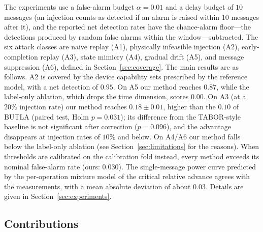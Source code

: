 \documentclass[manuscript,screen,review]{acmart}
\begin{document}
The experiments use a false-alarm budget $\alpha=0.01$ and a delay budget of $10$ messages (an injection counts as detected if an alarm is raised within $10$ messages after it), and the reported net detection rates have the chance-alarm floor---the detections produced by random false alarms within the window---subtracted. The six attack classes are naive replay ({A1}), physically infeasible injection ({A2}), early-completion replay ({A3}), state mimicry ({A4}), gradual drift ({A5}), and message suppression ({A6}), defined in Section~\ref{sec:coverage}. The main results are as follows. {A2} is covered by the device capability sets prescribed by the reference model, with a net detection of $0.95$. On {A5} our method reaches $0.87$, while the label-only ablation, which drops the time dimension, scores $0.00$. On {A3} (at a $20\%$ injection rate) our method reaches $0.18{\pm}0.01$, higher than the $0.10$ of {BUTLA} (paired test, {Holm} $p=0.031$); its difference from the {TABOR}-style baseline is not significant after correction ($p=0.096$), and the advantage disappears at injection rates of $10\%$ and below. On {A4}/{A6} our method falls below the label-only ablation (see Section~\ref{sec:limitations} for the reasons). When thresholds are calibrated on the calibration fold instead, every method exceeds its nominal false-alarm rate (ours: $0.030$). The single-message power curve predicted by the per-operation mixture model of the critical relative advance agrees with the measurements, with a mean absolute deviation of about $0.03$. Details are given in Section~\ref{sec:experiments}.

\subsection{Contributions}
\label{sec:intro_contrib}
\end{document}
